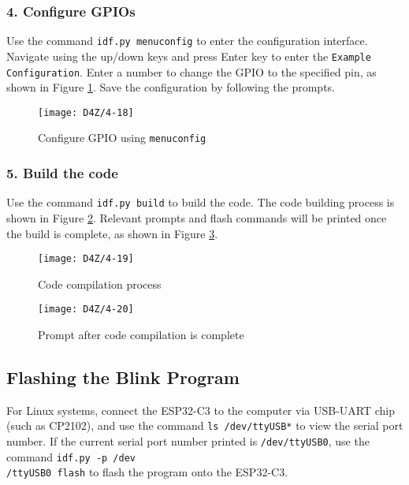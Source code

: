 \documentclass[a4paper,12pt]{book}
\begin{document}
\subsubsection{4. Configure GPIOs}
Use the command \verb|idf.py menuconfig| to enter the configuration interface. Navigate using the up/down keys and press Enter key to enter the \verb|Example Configuration|. Enter a number to change the GPIO to the specified pin, as shown in Figure 
\ref{Configure GPIO using menuconfig}. Save the configuration by following the prompts.

\begin{figure}[h!]
    \Centering
    \texttt{[image: D4Z/4-18]}
    \caption{Configure GPIO using \texttt{menuconfig}}
    \label{Configure GPIO using menuconfig}
\end{figure}

\subsubsection{5. Build the code}
Use the command \verb|idf.py build| to build the code. The code building process is shown in Figure \ref{Code compilation process}. Relevant prompts and flash commands will be printed once the build is complete, as shown in Figure \ref{Prompt after code compilation is complete}.

\begin{figure}[h!]
    \Centering
    \texttt{[image: D4Z/4-19]}
    \caption{Code compilation process}
    \label{Code compilation process}
\end{figure}

\begin{figure}[h!]
    \Centering
    \texttt{[image: D4Z/4-20]}
    \caption{Prompt after code compilation is complete}
    \label{Prompt after code compilation is complete}
\end{figure}

\subsection{Flashing the Blink Program}
For Linux systems, connect the ESP32-C3 to the computer via USB-UART chip (such as CP2102), and use the command \verb|ls /dev/ttyUSB*| to view the serial port number. If the current serial port number printed is \verb|/dev/ttyUSB0|, use the command \verb|idf.py -p /dev|\\ \verb|/ttyUSB0 flash| to flash the program onto the ESP32-C3.
\end{document}
